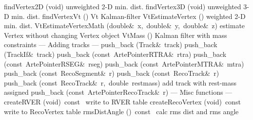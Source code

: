 \documentclass{article}
\begin{document}
\begin{cxxentry}
\begin{cxxclass}
\begin{cxxpublic}
        {findVertex2D}
        {(void)}
        { unweighted 2-D min. dist.}
        {}
\label{cxx.1.2.49}
        {findVertex3D}
        {(void)}
        { unweighted 3-D min. dist.}
        {}
\label{cxx.1.2.50}
        {findVertexVt}
        {()}
        { Vt Kalman-filter}
        {}
\label{cxx.1.2.51}
        {VtEstimateVertex}
        {()}
        { weighted 2-D min. dist.}
        {}
\label{cxx.1.2.52}
        {VtEstimateVertexMath}
        {(double\&\ x,\ double\&\ y,\ double\&\ z)}
        { estimate Vertex without changing Vertex object}
        {}
\label{cxx.1.2.53}
        {VtMass}
        {()}
        { Kalman filter with mass constraints}
        {}
\label{cxx.1.2.54}
\cxxitem{}
        {--- Adding tracks --- }
        {}
        {}
        {}
\label{cxx.1.2.55}
        {push\_back}
        {(Track\&\ track)}
        {}
        {}
\label{cxx.1.2.56}
        {push\_back}
        {(TrackIf\&\ track)}
        {}
        {}
\label{cxx.1.2.57}
        {push\_back}
        {(const\ ArtePointer\<RTRA\>\&\ rtra)}
        {}
        {}
\label{cxx.1.2.58}
        {push\_back}
        {(const\ ArtePointer\<RSEG\>\&\ rseg)}
        {}
        {}
\label{cxx.1.2.59}
        {push\_back}
        {(const\ ArtePointer\<MTRA\>\&\ mtra)}
        {}
        {}
\label{cxx.1.2.60}
        {push\_back}
        {(const\ RecoSegment\&\ r)}
        {}
        {}
\label{cxx.1.2.61}
        {push\_back}
        {(const\ RecoTrack\&\ r)}
        {}
        {}
\label{cxx.1.2.62}
        {push\_back}
        {(const\ RecoTrack\&\ r,\ double\ restmass)}
        { add track with rest-mass assigned}
        {}
\label{cxx.1.2.63}
        {push\_back}
        {(const\ ArtePointer\<RecoTrack\>\&\ r)}
        {}
        {}
\label{cxx.1.2.64}
\cxxitem{}
        {--- Misc functions --- }
        {}
        {}
        {}
\label{cxx.1.2.65}
        {createRVER}
        {(void)\ const\ }
        { write to RVER table}
        {}
\label{cxx.1.2.66}
        {createRecoVertex}
        {(void)\ const\ }
        { write to RecoVertex table}
        {}
\label{cxx.1.2.67}
        {rmsDistAngle}
        {()\ const\ }
        { calc rms dist and rms angle}
        {}
\label{cxx.1.2.68}

\end{cxxpublic}
\end{cxxclass}
\end{cxxentry}
\end{document}

